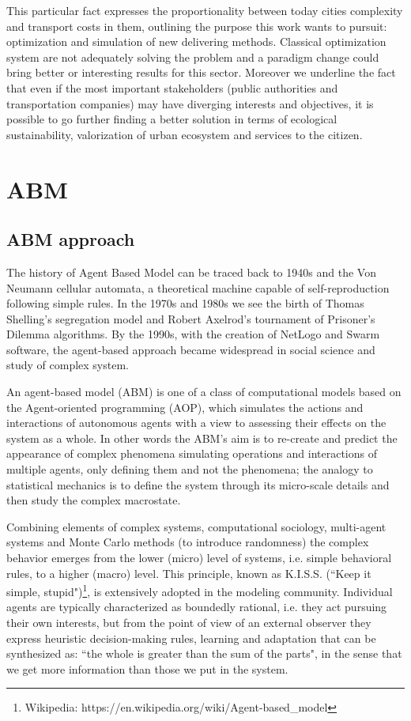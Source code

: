 \documentclass[11pt,a4paper]{article}
\begin{document}
This particular fact expresses the proportionality between today cities complexity and transport costs in them, outlining the purpose this work wants to pursuit: optimization and simulation of new delivering methods. 
Classical optimization system are not adequately solving the problem and a paradigm change could bring better or interesting results for this sector. 
Moreover we underline the fact that even if the most important stakeholders (public authorities and transportation companies) may have diverging interests and objectives, it is possible to go further finding a better solution in terms of ecological sustainability, valorization of urban ecosystem and services to the citizen. 

\newpage 
\section{ABM}
\subsection{ABM approach}
The history of Agent Based Model can be traced back to 1940s and the Von Neumann cellular automata, a theoretical machine capable of self-reproduction following simple rules.
In the 1970s and 1980s we see the birth of Thomas Shelling's segregation model and Robert Axelrod's tournament of Prisoner's Dilemma algorithms.
By the 1990s, with the creation of NetLogo and Swarm software, the agent-based approach became widespread in social science and study of complex system.

An agent-based model (ABM) is one of a class of computational models based on the Agent-oriented programming (AOP), which simulates the actions and interactions of autonomous agents with a view to assessing their effects on the system as a whole. 
In other words the ABM's aim is to re-create and predict the appearance of complex phenomena simulating operations and interactions of multiple agents, only defining them and not the phenomena; the analogy to statistical mechanics is to define the system through its micro-scale details and then study the complex macrostate. 

Combining elements of complex systems, computational sociology, multi-agent systems and Monte Carlo methods (to introduce randomness) the complex behavior emerges from the lower (micro) level of systems, i.e. simple behavioral rules, to a higher (macro) level. 
This principle, known as K.I.S.S. (“Keep it simple, stupid")\footnote{Wikipedia: https://en.wikipedia.org/wiki/Agent-based\_model}, is extensively adopted in the modeling community. Individual agents are typically characterized as boundedly rational, i.e. they act pursuing their own interests, but from the point of view of an external observer they express heuristic decision-making rules, learning and adaptation that can be synthesized as: “the whole is greater than the sum of the parts", in the sense that we get more information than those we put in the system.
\end{document}
